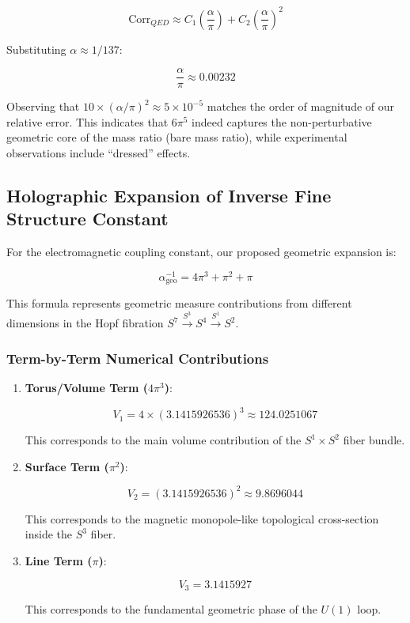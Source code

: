 \[\text{Corr}_{QED} \approx C_1 \left( \frac{\alpha}{\pi} \right) + C_2 \left( \frac{\alpha}{\pi} \right)^2\]

Substituting $\alpha \approx 1/137$:

\[\frac{\alpha}{\pi} \approx 0.00232\]

Observing that $10 \times (\alpha/\pi)^2 \approx 5 \times 10^{-5}$ matches the order of magnitude of our relative error. This indicates that $6\pi^5$ indeed captures the non-perturbative geometric core of the mass ratio (bare mass ratio), while experimental observations include ``dressed'' effects.

\subsection{Holographic Expansion of Inverse Fine Structure Constant}

For the electromagnetic coupling constant, our proposed geometric expansion is:

\[\alpha_{\text{geo}}^{-1} = 4\pi^3 + \pi^2 + \pi\]

This formula represents geometric measure contributions from different dimensions in the Hopf fibration $S^7 \xrightarrow{S^3} S^4 \xrightarrow{S^1} S^2$.

\subsubsection{Term-by-Term Numerical Contributions}

\begin{enumerate}
\item \textbf{Torus/Volume Term ($4\pi^3$)}:

   \[V_1 = 4 \times (3.1415926536)^3 \approx 124.0251067\]

   This corresponds to the main volume contribution of the $S^1 \times S^2$ fiber bundle.

\item \textbf{Surface Term ($\pi^2$)}:

   \[V_2 = (3.1415926536)^2 \approx 9.8696044\]

   This corresponds to the magnetic monopole-like topological cross-section inside the $S^3$ fiber.

\item \textbf{Line Term ($\pi$)}:

   \[V_3 = 3.1415927\]

   This corresponds to the fundamental geometric phase of the $U(1)$ loop.
\end{enumerate}

